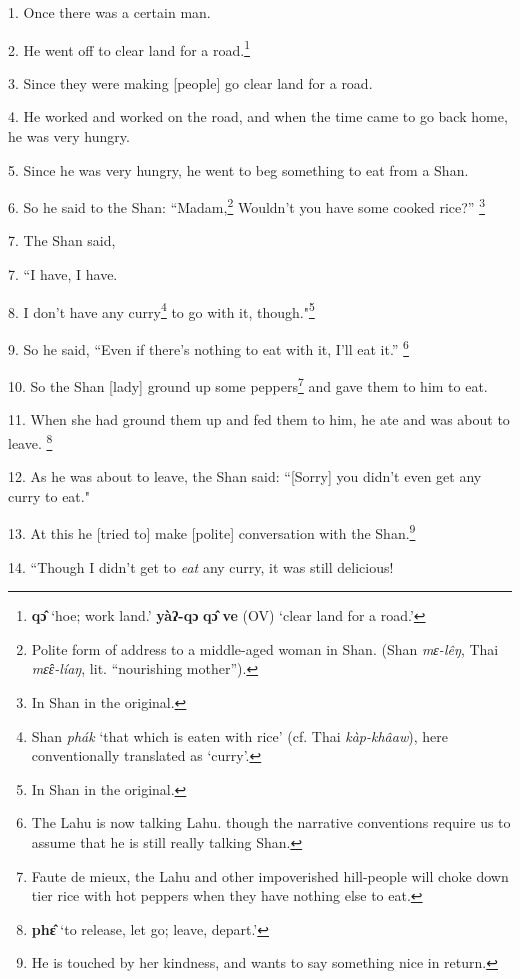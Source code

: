 \setcounter{footnote}{0}


1. Once there was a certain man.

2. He went off to clear land for a road.\footnote{\textbf{qɔ̂} `hoe; work land.' \textbf{yàʔ-qɔ} \textbf{qɔ̂} \textbf{ve} (OV) `clear land for a road.'}

3. Since they were making [people] go clear land for a road.

4. He worked and worked on the road, and when the time came to go back home, he
was very hungry.

5. Since he was very hungry, he went to beg something to eat from a Shan.

6. So he said to the Shan: ``Madam,\footnote{Polite form of address to a middle-aged woman in Shan. (Shan \textit{mɛ-lêŋ}, Thai \textit{mɛ̂ɛ-líaŋ}, lit. ``nourishing mother'').} Wouldn't you have some cooked rice?''
\footnote{In Shan in the original.}

7. The Shan said,

7. ``I have, I have.

8. I don't have any curry\footnote{Shan \textit{phák} `that which is eaten with rice' (cf. Thai \textit{kàp-khâaw}), here conventionally translated as `curry'.} to go with it, though."\footnote{In Shan in the original.}

9. So he said, ``Even if there's nothing to eat with it, I'll eat it.''
\footnote{The Lahu is now talking Lahu. though the narrative conventions require us to assume that he is still really talking Shan.}

10. So the Shan [lady] ground up some peppers\footnote{Faute de mieux, the Lahu and other impoverished hill-people will choke down tier rice with hot peppers when they have nothing else to eat.} and gave them to him to eat.

11. When she had ground them up and fed them to him, he ate and was about to leave.
\footnote{\textbf{phɛ̂} `to release, let go; leave, depart.'}

12. As he was about to leave, the Shan said: ``[Sorry] you didn't even get
any curry to eat."

13. At this he [tried to] make [polite] conversation with the Shan.\footnote{He is touched by her kindness, and wants to say something nice in return.}

14. ``Though I didn't get to \textit{eat} any curry, it was still delicious!


